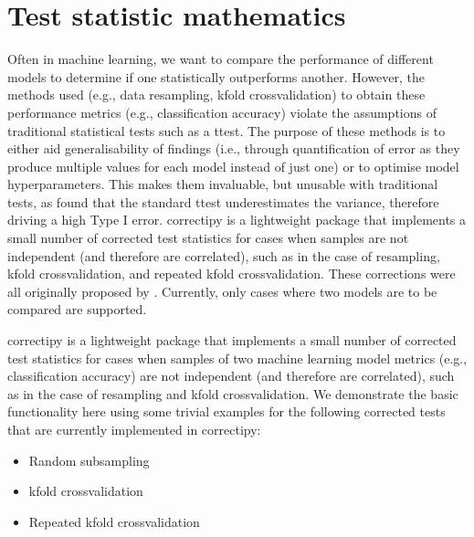 \documentclass[letterpaper,10pt,english]{sphinxmanual}
\begin{document}
\chapter{Test statistic mathematics}
\label{\detokenize{statistic_info:test-statistic-mathematics}}\label{\detokenize{statistic_info::doc}}
Often in machine learning, we want to compare the performance of
different models to determine if one statistically outperforms another.
However, the methods used (e.g., data resampling, k\sphinxhyphen{}fold
cross\sphinxhyphen{}validation) to obtain these performance metrics (e.g.,
classification accuracy) violate the assumptions of traditional
statistical tests such as a t\sphinxhyphen{}test. The purpose of these methods is to
either aid generalisability of findings (i.e., through quantification of
error as they produce multiple values for each model instead of just
one) or to optimise model hyperparameters. This makes them invaluable,
but unusable with traditional tests, as  found that the
standard t\sphinxhyphen{}test underestimates the variance, therefore driving a high
Type I error. correctipy is a lightweight package that implements a
small number of corrected test statistics for cases when samples are not
independent (and therefore are correlated), such as in the case of
resampling, k\sphinxhyphen{}fold cross\sphinxhyphen{}validation, and repeated k\sphinxhyphen{}fold
cross\sphinxhyphen{}validation. These corrections were all originally proposed by .
Currently, only cases where two models are to be compared are supported.

correctipy is a lightweight package that implements a small number of corrected test statistics for cases when samples of two machine learning model metrics (e.g., classification accuracy) are not independent (and therefore are correlated), such as in the case of resampling and k\sphinxhyphen{}fold cross\sphinxhyphen{}validation. We demonstrate the basic functionality here using some trivial examples for the following corrected tests that are currently implemented in correctipy:
\begin{itemize}
\item {} 
Random subsampling

\item {} 
k\sphinxhyphen{}fold cross\sphinxhyphen{}validation

\item {} 
Repeated k\sphinxhyphen{}fold cross\sphinxhyphen{}validation

\end{itemize}
\end{document}
